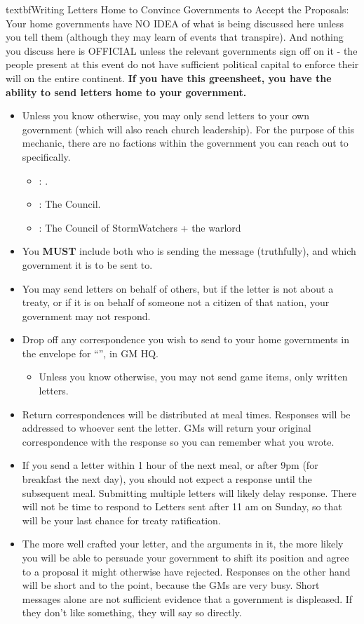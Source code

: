 \documentclass[green]{GL2020}
\begin{document}
textbf{Writing Letters Home to Convince Governments to Accept the Proposals:}
Your home governments have NO IDEA of what is being discussed here unless you tell them (although they may learn of events that transpire). And nothing you discuss here is OFFICIAL unless the relevant governments sign off on it - the people present at this event do not have sufficient political capital to enforce their will on the entire continent. \textbf{If you have this greensheet, you have the ability to send letters home to your government.}
\begin{itemize}
  \item Unless you know otherwise, you may only send letters to your own government (which will also reach church leadership). For the purpose of this mechanic, there are no factions within the government you can reach out to specifically.
  \begin{itemize}
    \item \cFarm{}: \cQueen{\full}.
    \item \cTech{}: The Council.
    \item \cShip{}: The Council of StormWatchers + the warlord
  \end{itemize}
  \item You \textbf{MUST} include both who is sending the message (truthfully), and which government it is to be sent to.
  \item You may send letters on behalf of others, but if the letter is not about a treaty, or if it is on behalf of someone not a citizen of that nation, your government may not respond.
  \item Drop off any correspondence you wish to send to your home governments in the envelope for “\sSignT{}”, in GM HQ.
  \begin{itemize}
    \item Unless you know otherwise, you may not send game items, only written letters.
  \end{itemize}
  \item Return correspondences will be distributed at meal times. Responses will be addressed to whoever sent the letter. GMs will return your original correspondence with the response so you can remember what you wrote.
  \item If you send a letter within 1 hour of the next meal, or after 9pm (for breakfast the next day), you should not expect a response until the subsequent meal. Submitting multiple letters will likely delay response. There will not be time to respond to Letters sent after 11 am on Sunday, so that will be your last chance for treaty ratification.
  \item The more well crafted your letter, and the arguments in it, the more likely you will be able to persuade your government to shift its position and agree to a proposal it might otherwise have rejected. Responses on the other hand will be short and to the point, because the GMs are very busy. Short messages alone are not sufficient evidence that a government is displeased. If they don’t like something, they will say so directly.
\end{itemize}
\end{document}
